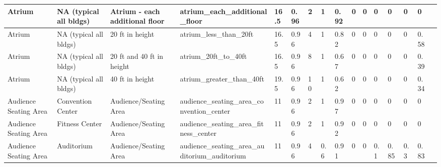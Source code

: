\begin{center}
\begin{landscape}
\begin{longtable}{|p{0.75in}|p{0.75in}|p{0.75in}|p{0.75in}|p{0.3in}|p{0.3in}|p{0.3in}|p{0.3in}|p{0.3in}|p{0.3in}|p{0.3in}|p{0.3in}|p{0.3in}|p{0.3in}|p{0.3in}|p{0.6in}|}
      Atrium                                  & NA (typical all bldgs)      & Atrium - each additional floor                  & atrium\_each\_additional\_floor                                 & 16.5 & 0.96 & 2  & 1      & 0.92  & 0     & 0     & 0    & 0    & 0    & 0    &                                                                                       \\ \hline
      Atrium                                  & NA (typical all bldgs)      & 20 ft in height                                 & atrium\_less\_than\_20ft                                        & 16.5 & 0.96 & 4  & 1      & 0.82  & 0     & 0     & 0    & 0    & 0    & 0.58 &                                                                                       \\ \hline
      Atrium                                  & NA (typical all bldgs)      & 20 ft and 40 ft in height                       & atrium\_20ft\_to\_40ft                                          & 16.5 & 0.96 & 8  & 1      & 0.67  & 0     & 0     & 0    & 0    & 0    & 0.39 &                                                                                       \\ \hline
      Atrium                                  & NA (typical all bldgs)      & 40 ft in height                                 & atrium\_greater\_than\_40ft                                     & 19.5 & 0.96 & 10 & 1      & 0.62  & 0     & 0     & 0    & 0    & 0    & 0.34 &                                                                                       \\ \hline
      Audience Seating Area                   & Convention Center           & Audience/Seating Area                           & audience\_seating\_area\_convention\_center                     & 11   & 0.96 & 2  & 1      & 0.97  & 0     & 0     & 0    & 0    & 0    & 0    &                                                                                       \\ \hline
      Audience Seating Area                   & Fitness Center              & Audience/Seating Area                           & audience\_seating\_area\_fitness\_center                        & 11   & 0.96 & 2  & 1      & 0.92  & 0     & 0     & 0    & 0    & 0    & 0    &                                                                                       \\ \hline
      Audience Seating Area                   & Auditorium                  & Audience/Seating Area                           & audience\_seating\_area\_auditorium\_auditorium                 & 11   & 0.96 & 4  & 0.6    & 0.91  & 0     & 0     & 0.1  & 0.85 & 0.3  & 0.83 &                                                                                       \\ \hline

\end{longtable}
\end{landscape}
\end{center}
